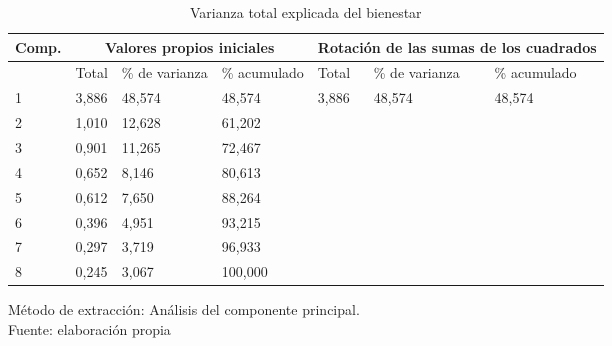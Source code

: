 \begin{table}[h]
    \caption {Varianza total explicada del bienestar}
	\label{tab:varianzaExplicadaB}
	\setlength\extrarowheight{5pt}
	
	\begin{tabular}{p{1.5cm} p{1.9cm} p{1.7cm} p{1.7cm} p{1.9cm} p{1.9cm} p{1.7cm}}
	\toprule
	Comp.	& \multicolumn{3}{c}{Valores propios iniciales} & \multicolumn{3}{c}{Rotación de las sumas de los cuadrados} \\
	\midrule
		& Total	& \% de varianza	& \% acumulado	& Total	& \% de varianza 	& \% acumulado \\
	\midrule
	1  & 3,886 & 48,574 & 	48,574 & 3,886 & 48,574 & 48,574 \\
	2  & 1,010 & 12,628 & 	61,202 &  &  &  \\
	3  & 0,901 & 11,265 &	72,467 &  &  &  \\
	4  & 0,652 & 8,146 &	80,613 &  &  &  \\
	5  & 0,612 & 7,650 &	88,264 &  &  &  \\
	6  & 0,396 & 4,951 &	93,215 &  &  &  \\
	7  & 0,297 & 3,719 &	96,933 &  &  &  \\
	8  & 0,245 & 3,067 &	100,000 &  &  &  \\
	\bottomrule
	\end{tabular}
	
	\center
	\footnotesize
	Método de extracción: Análisis del componente principal.\\
	Fuente: elaboración propia
\end{table}
